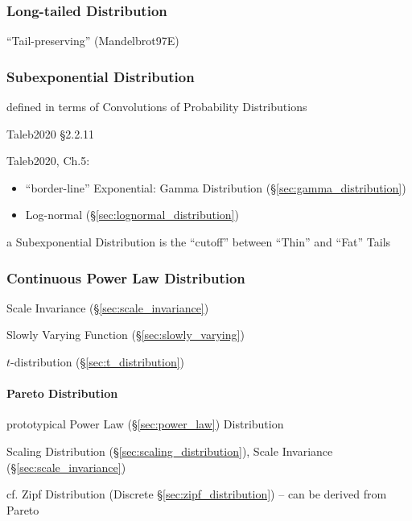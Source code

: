\subsubsection{Long-tailed Distribution}\label{sec:long_tailed}

``Tail-preserving'' (Mandelbrot97E)



\subsubsection{Subexponential Distribution}
\label{sec:subexponential_distribution}

defined in terms of Convolutions of Probability Distributions

Taleb2020 \S 2.2.11

Taleb2020, Ch.5:

\begin{itemize}
  \item ``border-line'' Exponential: Gamma Distribution
    (\S\ref{sec:gamma_distribution})
  \item Log-normal (\S\ref{sec:lognormal_distribution})
\end{itemize}

a Subexponential Distribution is the ``cutoff'' between ``Thin'' and ``Fat''
Tails



\subsubsection{Continuous Power Law Distribution}
\label{sec:continuous_power_law}

Scale Invariance (\S\ref{sec:scale_invariance})

Slowly Varying Function (\S\ref{sec:slowly_varying})

$t$-distribution (\S\ref{sec:t_distribution})



\paragraph{Pareto Distribution}\label{sec:pareto_distribution}\hfill

prototypical Power Law (\S\ref{sec:power_law}) Distribution

Scaling Distribution (\S\ref{sec:scaling_distribution}),
Scale Invariance (\S\ref{sec:scale_invariance})

cf. Zipf Distribution (Discrete \S\ref{sec:zipf_distribution}) -- can be derived
from Pareto

